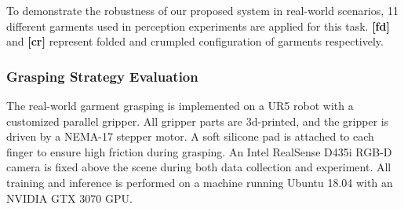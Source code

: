 \documentclass[letterpaper, 10 pt, conference]{ieeeconf}  %
\begin{document}
\begin{table}[t!]
    \centering
     \vspace{4mm}
    \caption{Performance of Robotic Hanging}
    \vspace{-2mm}
       \par
         \begin{flushleft}
To demonstrate the robustness of our proposed system in real-world scenarios, 11 different garments used in perception experiments are applied for this task. \textbf{[fd]} and \textbf{[cr]} represent folded and crumpled configuration of garments respectively.
\end{flushleft}
     \vspace{-18pt}
    \label{table:hanging}
\end{table}


\subsubsection{Grasping Strategy Evaluation}
The real-world garment grasping is implemented on a UR5 robot with a customized parallel gripper. All gripper parts are 3d-printed, and the gripper is driven by a NEMA-17 stepper motor. A soft silicone pad is attached to each finger to ensure high friction during grasping. An Intel RealSense D435i RGB-D camera is fixed above the scene during both data collection and experiment. All training and inference is performed on a machine running Ubuntu 18.04 with an NVIDIA GTX 3070 GPU. 
\end{document}
